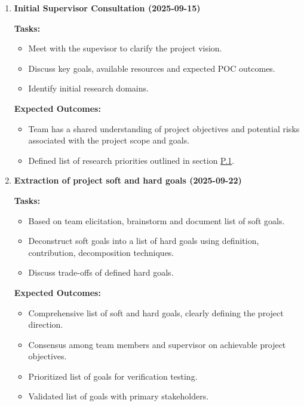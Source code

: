 \documentclass[12pt]{article}
\theoremstyle{definition}
\begin{document}
\begin{enumerate}

  \item \textbf{Initial Supervisor Consultation (2025-09-15)}  

  \textbf{Tasks:}
  \begin{itemize}
      \item Meet with the supevisor to clarify the project vision. 
      \item Discuss key goals, available resources and expected POC outcomes. 
      \item Identify initial research domains. 
  \end{itemize}

  \textbf{Expected Outcomes:}
  \begin{itemize}
      \item Team has a shared understanding of project objectives and potential
       risks associated with the project scope and goals. 
      \item Defined list of research priorities outlined in section
      \hyperref[item: p1]{P.1}.
  \end{itemize}

  \vspace{0.8em}

  \item \textbf{Extraction of project soft and hard goals (2025-09-22)}  

  \textbf{Tasks:}
  \begin{itemize}
      \item Based on team elicitation, brainstorm and document list of soft 
      goals. 
      \item Deconstruct soft goals into a list of hard goals using definition,
       contribution, decomposition techniques. 
      \item Discuss trade-offs of defined hard goals. 
  \end{itemize}

  \textbf{Expected Outcomes:}
  \begin{itemize}
      \item Comprehensive list of soft and hard goals, clearly defining the 
      project direction. 
      \item Consensus among team members and supervisor on achievable project
       objectives. 
      \item Prioritized list of goals for verification testing. 
      \item Validated list of goals with primary stakeholders. 
  \end{itemize}


\end{enumerate}
\end{document}
